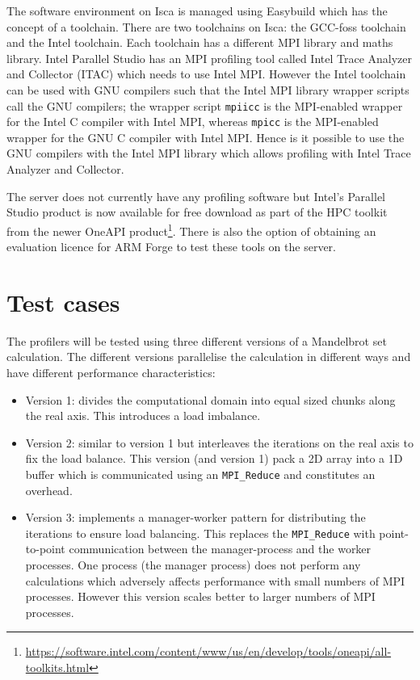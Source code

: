 \documentclass[a4paper,titlepage]{article}
\begin{document}
The software environment on Isca is managed using Easybuild which has the concept of a toolchain. There are two toolchains on Isca: the GCC-foss toolchain and the Intel toolchain. Each toolchain has a different MPI library and maths library. Intel Parallel Studio has an MPI profiling tool called Intel Trace Analyzer and Collector (ITAC) which needs to use Intel MPI. However the Intel toolchain can be used with GNU compilers such that the Intel MPI library wrapper scripts call the GNU compilers; the wrapper script \texttt{mpiicc} is the MPI-enabled wrapper for the Intel C compiler with Intel MPI, whereas \texttt{mpicc} is the MPI-enabled wrapper for the GNU C compiler with Intel MPI. Hence is it possible to use the GNU compilers with the Intel MPI library which allows profiling with Intel Trace Analyzer and Collector. 

The server does not currently have any profiling software but Intel's Parallel Studio product is now available for free download as part of the HPC toolkit from the newer OneAPI product\footnote{\url{https://software.intel.com/content/www/us/en/develop/tools/oneapi/all-toolkits.html}}. There is also the option of obtaining an evaluation licence for ARM Forge to test these tools on the server.


\section{Test cases}
\label{section:test_cases}

The profilers will be tested using three different versions of a Mandelbrot set calculation. The different versions parallelise the calculation in different ways and have different performance characteristics:
\begin{itemize}
\item Version 1: divides the computational domain into equal sized chunks along the real axis. This introduces a load imbalance.
\item Version 2: similar to version 1 but interleaves the iterations on the real axis to fix the load balance. This version (and version 1) pack a 2D array into a 1D buffer which is communicated using an \verb+MPI_Reduce+ and constitutes an overhead.
\item Version 3: implements a manager-worker pattern for distributing the iterations to ensure load balancing. This replaces the \verb+MPI_Reduce+ with point-to-point communication between the manager-process and the worker processes. One process (the manager process) does not perform any calculations which adversely affects performance with small numbers of MPI processes. However this version scales better to larger numbers of MPI processes.
\end{itemize}
\end{document}
